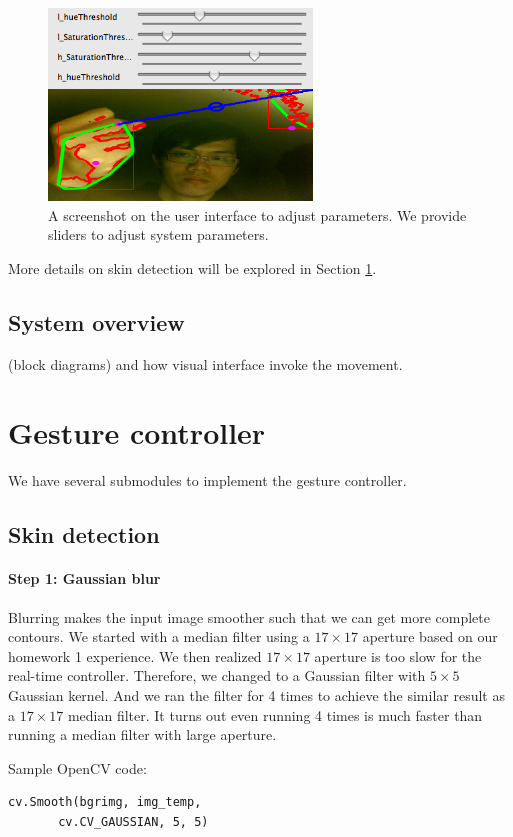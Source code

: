 \documentclass[10pt,twocolumn,letterpaper]{article}
\begin{document}
\begin{figure}[h]
\centering
\includegraphics[width=7cm]{adjustui.png}
\caption{A screenshot on the user interface to adjust parameters. We provide 
sliders to adjust system parameters.}
\label{fig:adjusting}
\end{figure}

More details on skin detection will be explored in Section \ref{sec:gesture}.

\subsection{System overview}
(block diagrams) and how visual interface invoke the movement.

\section{Gesture controller}
\label{sec:gesture}
We have several submodules to implement the gesture controller.

\subsection{Skin detection}
\label{sec:skin}
\paragraph{Step 1: Gaussian blur}
Blurring makes the input image smoother such that we can get more complete contours. 
We started with a median filter using a $17 \times 17$ aperture based on our homework 1 experience. 
We then realized $17 \times 17$ aperture is too slow for the real-time controller. Therefore, we 
changed to a Gaussian filter with $5 \times 5$ Gaussian kernel. And we ran the filter for 4 times 
to achieve the similar result as a $17 \times 17$ median filter. It turns out even running 4 times 
is much faster than running a median filter with large aperture.

Sample OpenCV code:
\begin{verbatim}
cv.Smooth(bgrimg, img_temp, 
       cv.CV_GAUSSIAN, 5, 5)
\end{verbatim}
\end{document}
